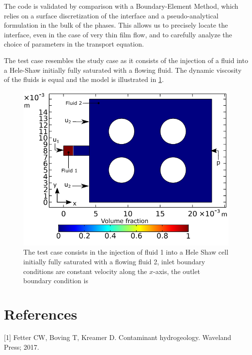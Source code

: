\documentclass[]{article}
\begin{document}
The code is validated by comparison with a Boundary-Element Method,
which relies on a surface discretization of the interface and a
pseudo-analytical formulation in the bulk of the phases. This allows us
to precisely locate the interface, even in the case of very thin film
flow, and to carefully analyze the choice of parameters in the transport
equation.

The test case resembles the study case as it consists of the injection
of a fluid into a Hele-Shaw initially fully saturated with a flowing
fluid. The dynamic viscosity of the fluids is equal and the model is
illustrated in \cref{fig:testCase}.

\begin{figure}
\hypertarget{fig:testCase}{%
\centering
\includegraphics{figures/pdf/TestCase_validation.pdf}
\caption{The test case consists in the injection of fluid 1 into a Hele
Shaw cell initially fully saturated with a flowing fluid 2, inlet
boundary conditions are constant velocity along the \(x\)-axis, the
outlet boundary condition is}\label{fig:testCase}
}
\end{figure}

\hypertarget{references}{%
\section*{References}\label{references}}

\hypertarget{refs}{}
\leavevmode\hypertarget{ref-fetter2017contaminant}{}%
{[}1{]} Fetter CW, Boving T, Kreamer D. Contaminant hydrogeology.
Waveland Press; 2017.
\end{document}
